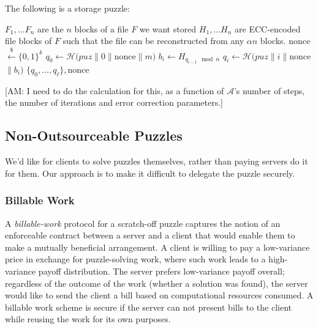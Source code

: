 \documentclass[]{article}
\newcommand{\anote}[1]{{\color{magenta}[AM: #1]}}
\theoremstyle{remark}
\newcommand{\hash}{\mathcal{H}}
\newcommand{\Adv}{\mathcal{A}}
\newcommand{\samples}{\overset{\$}{←}}
\begin{document}
The following is a storage puzzle:

\begin{algorithmic}[0]
 \State $F_1,...F_n$ are the $n$ blocks of a file $F$ we want stored
 \State $H_1,...H_n$ are ECC-encoded file blocks of $F$ such that the file can be reconstructed from any $αn$ blocks.
   \State nonce $\samples \{0,1\}^k$
   \State $q_0 ← \hash(puz ∥ 0 ∥ $nonce$ ∥ m)$
      \State $b_i ← H_{q_{i-1} \mod n}$
      \State $q_i ← \hash(puz ∥ i ∥ $nonce$ ∥ b_i)$
   \EndFor
   \State \Return $\{q_0,...,q_ℓ\}, $nonce
  \EndFunction
\end{algorithmic}
\anote{I need to do the calculation for this, as a function of $\Adv$'s number of steps, the number of iterations and error correction parameters.}


\subsection{Non-Outsourceable Puzzles}
We'd like for clients to solve puzzles themselves, rather than paying servers do it for them. Our approach is to make it difficult to delegate the puzzle securely.

\subsubsection{Billable Work}

A {\em billable-work} protocol for a scratch-off puzzle captures the notion of an enforceable contract between a server and a client that would enable them to make a mutually beneficial arrangement. A client is willing to pay a low-variance price in exchange for puzzle-solving work, where such work leads to a high-variance payoff distribution. The server prefers low-variance payoff overall; regardless of the outcome of the work (whether a  solution was found), the server would like to send the client a bill based on computational resources consumed. A billable work scheme is secure if the server can not present bills to the client while reusing the work for its own purposes.
\end{document}
